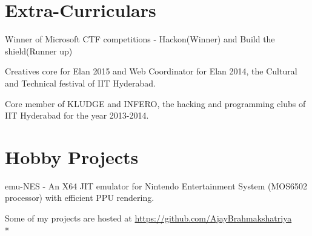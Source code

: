 \documentclass[10pt]{article}
\newcommand{\punt}[1]{}
\begin{document}
\section*{Extra-Curriculars}
\begin{compactitem}
\item Winner of Microsoft CTF competitions - Hackon(Winner) and Build the shield(Runner up)
\item Creatives core for Elan 2015 and Web Coordinator for Elan 2014, the Cultural and Technical festival of IIT Hyderabad.
\item Core member of KLUDGE and INFERO, the hacking and programming clubs of IIT Hyderabad for the year 2013-2014.
\end{compactitem}


\section*{Hobby Projects} 
\begin{compactitem}
\item emu-NES - An X64 JIT emulator for Nintendo Entertainment System (MOS6502 processor) with efficient PPU rendering. \punt{https://github.com/AjayBrahmakshatriya/emu-NES}
\item {\sf Some of my projects are hosted at \url{https://github.com/AjayBrahmakshatriya} } \\*
\end{compactitem}



\end{document}
